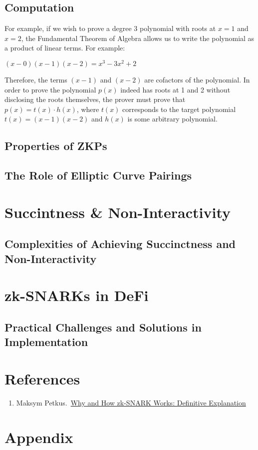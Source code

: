\documentclass[12pt]{article}
\begin{document}
\subsection{Computation}
For example, if we wish to prove a degree 3 polynomial with roots at \(x=1\) and \(x=2\), the Fundamental Theorem of Algebra allows us to write the polynomial
as a product of linear terms. For example:

\begin{center}
    \((x-0)(x-1)(x-2) = x^3 - 3x^2 + 2\) 
\end{center}

Therefore, the terms \((x-1)\) and \((x-2)\) are cofactors of the polynomial. In order to prove the polynomial \(p(x)\) indeed has roots at 1 and 2 without disclosing
the roots themselves, the prover must prove that \(p(x) = t(x) \cdot h(x)\), where \(t(x)\) corresponds to the target polynomial \(t(x) = (x-1)(x-2)\) and \(h(x)\) is some
arbitrary polynomial.   
    

\subsection{Properties of ZKPs}

\subsection{The Role of Elliptic Curve Pairings}

\section{Succintness \& Non-Interactivity}
\subsection{Complexities of Achieving Succinctness and Non-Interactivity}

\section{zk-SNARKs in DeFi}
\subsection{Practical Challenges and Solutions in Implementation}






\section*{References}
\begin{enumerate}
    \renewcommand{\labelenumi}{[\Alph{enumi}]}
    \item Maksym Petkus.\ \href{https://arxiv.org/pdf/1906.07221.pdf}{Why and How zk-SNARK Works: Definitive Explanation}
\end{enumerate}

\appendix
\section{Appendix}
\end{document}
